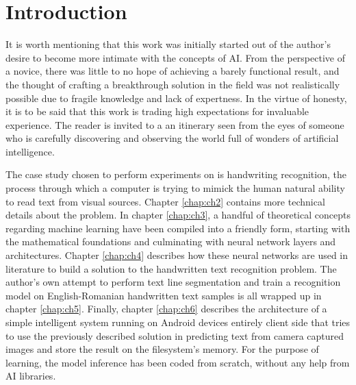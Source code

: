 \chapter{Introduction}

\label{intro}

It is worth mentioning that this work was initially started out of the author's desire to become more intimate with the concepts of AI. From the perspective of a novice, there was little to no hope of achieving a barely functional result, and the thought of crafting a breakthrough solution in the field was not realistically possible due to fragile knowledge and lack of expertness. In the virtue of honesty, it is to be said that this work is trading high expectations for invaluable experience. The reader is invited to a an itinerary seen from the eyes of someone who is carefully discovering and observing the world full of wonders of artificial intelligence. 

The case study chosen to perform experiments on is handwriting recognition, the process through which a computer is trying to mimick the human natural ability to read text from visual sources. Chapter \ref{chap:ch2} contains more technical details about the problem. In chapter \ref{chap:ch3}, a handful of theoretical concepts regarding machine learning have been compiled into a friendly form, starting with the mathematical foundations and culminating with neural network layers and architectures. Chapter \ref{chap:ch4} describes how these neural networks are used in literature to build a solution to the handwritten text recognition problem. The author's own attempt to perform text line segmentation and train a recognition model on English-Romanian handwritten text samples is all wrapped up in chapter \ref{chap:ch5}. Finally, chapter \ref{chap:ch6} describes the architecture of a simple intelligent system running on Android devices entirely client side that tries to use the previously described solution in predicting text from camera captured images and store the result on the filesystem's memory. For the purpose of learning, the model inference has been coded from scratch, without any help from AI libraries. 